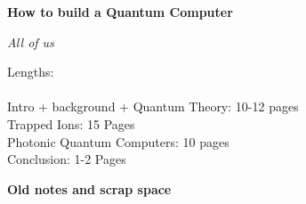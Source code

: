 \documentclass[12pt]{article}
\begin{document}
\begin{center}
    \Huge \textbf{How to build a Quantum Computer}
\end{center}
\vspace{-1em}

\begin{center}
    \emph{\large All of us}
\end{center}
\vspace{0.5em}
Lengths:\\ \\
Intro + background + Quantum Theory: 10-12 pages\\
Trapped Ions: 15 Pages\\
Photonic Quantum Computers: 10 pages\\
Conclusion: 1-2 Pages\\


\newpage

\newpage

\newpage

\newpage


\printbibliography

\begin{center}
    \Huge \textbf{Old notes and scrap space}
\end{center}
\vspace{-1em}






\newpage
\end{document}
